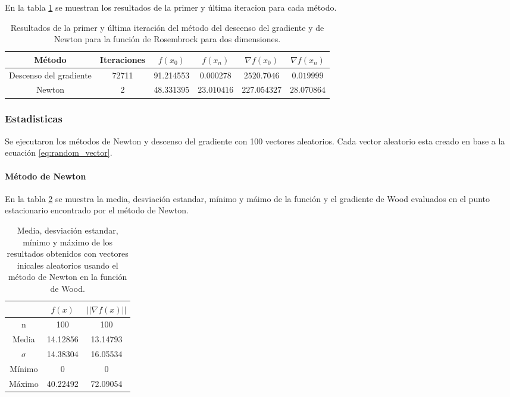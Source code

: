 En la tabla \ref{table:wood_random} se muestran los resultados de la primer y última iteracion para cada método.

\begin{table}[H]
    \centering
    \begin{tabular}{cccccc} \hline
        Método                 & Iteraciones & $f(x_0)$  & $f(x_n)$    & $\nabla f(x_0)$ & $\nabla f(x_n) $ \\ \hline
        Descenso del gradiente & 72711       & 91.214553 & $0.000278$  & $2520.7046$     & $0.019999$       \\
        Newton                 & 2           & 48.331395 & $23.010416$ & $227.054327$    & $28.070864$      \\ \hline
    \end{tabular}
    \caption{Resultados de la primer y última iteración del método del descenso del gradiente y de Newton para la función de Rosembrock para dos dimensiones.}
    \label{table:wood_random}
\end{table}

\subsubsection{Estadisticas}

Se ejecutaron los métodos de Newton y descenso del gradiente con 100 vectores aleatorios. Cada vector aleatorio esta creado en base a la ecuación \ref{eq:random_vector}.

\paragraph{Método de Newton}

En la tabla \ref{table:wood_4_random_newton} se muestra la media, desviación estandar, mínimo y máimo de la función y el gradiente de Wood evaluados en el punto estacionario encontrado por el método de Newton.

\begin{table}[H]
    \centering
    \begin{tabular}{ccc} \hline
                 & $f(x)$   & $||\nabla f(x)||$ \\ \hline
        n        & 100      & 100               \\
        Media    & 14.12856 & 13.14793          \\
        $\sigma$ & 14.38304 & 16.05534          \\
        Mínimo   & 0        & 0                 \\
        Máximo   & 40.22492 & 72.09054          \\\hline
    \end{tabular}
    \caption{Media, desviación estandar, mínimo y máximo de los resultados obtenidos con vectores inicales aleatorios usando el método de Newton en la función de Wood.}
    \label{table:wood_4_random_newton}
\end{table}


